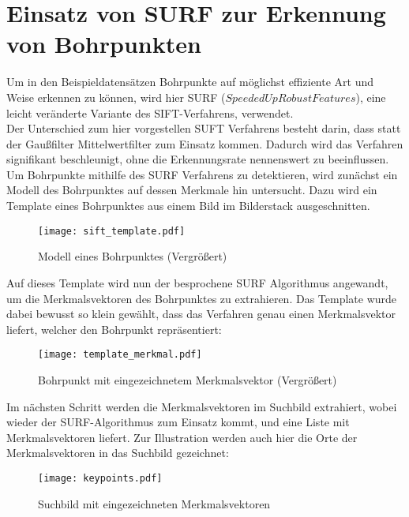 \section{Einsatz von SURF zur Erkennung von Bohrpunkten}
Um in den Beispieldatensätzen Bohrpunkte auf möglichst effiziente Art und Weise erkennen zu können, wird hier SURF ($Speeded Up Robust Features$), eine leicht veränderte Variante des SIFT-Verfahrens, verwendet. \\
Der Unterschied zum hier vorgestellen SUFT Verfahrens besteht darin, dass statt der Gaußfilter Mittelwertfilter zum Einsatz kommen. Dadurch wird das Verfahren signifikant beschleunigt, ohne die Erkennungsrate nennenswert zu beeinflussen. \cite{Bay2005} \\

Um Bohrpunkte mithilfe des SURF Verfahrens zu detektieren, wird zunächst ein Modell des Bohrpunktes auf dessen Merkmale hin untersucht. Dazu wird ein Template eines Bohrpunktes aus einem Bild im Bilderstack ausgeschnitten.
\begin{figure}[H]
  \begin{center}
    \texttt{[image: sift\_template.pdf]}
    \caption{Modell eines Bohrpunktes (Vergrößert)}
    \label{fig:sift_template}
  \end{center}
\end{figure}


Auf dieses Template wird nun der besprochene SURF Algorithmus angewandt, um die Merkmalsvektoren des Bohrpunktes zu extrahieren.
Das Template wurde dabei bewusst so klein gewählt, dass das Verfahren genau einen Merkmalsvektor liefert, welcher den Bohrpunkt repräsentiert:
\begin{figure}[H]
  \begin{center}
    \texttt{[image: template\_merkmal.pdf]}
    \caption{Bohrpunkt mit eingezeichnetem Merkmalsvektor (Vergrößert)}
    \label{fig:template_merkmal}
  \end{center}
\end{figure}

Im nächsten Schritt werden die Merkmalsvektoren im Suchbild extrahiert, wobei wieder der SURF-Algorithmus zum Einsatz kommt, und eine Liste mit Merkmalsvektoren liefert. Zur Illustration werden auch hier die Orte der Merkmalsvektoren in das Suchbild gezeichnet:
\begin{figure}[H]
  \begin{center}
    \texttt{[image: keypoints.pdf]}
    \caption{Suchbild mit eingezeichneten Merkmalsvektoren}
    \label{fig:suchbild_merkmal}
  \end{center}
\end{figure}

